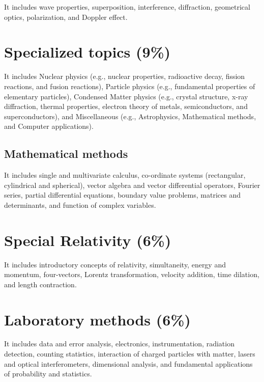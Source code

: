 \documentclass[12pt,a4paper]{article}
\begin{document}
\quad It includes wave properties, superposition, interference, diffraction, geometrical optics, polarization, and Doppler effect.


\section{Specialized topics (9\%)}

\quad It includes Nuclear physics (e.g., nuclear properties, radioactive decay, fission reactions, and fusion reactions), Particle physics (e.g., fundamental properties of elementary particles), Condensed Matter physics (e.g., crystal structure, x-ray diffraction, thermal properties, electron theory of metals, semiconductors, and superconductors), and Miscellaneous (e.g., Astrophysics, Mathematical methods, and Computer applications). 

\subsection{Mathematical methods}

It includes single and multivariate calculus, co-ordinate systems (rectangular, cylindrical and spherical), vector algebra and vector differential operators, Fourier series, partial differential equations, boundary value problems, matrices and determinants, and function of complex variables.


\section{Special Relativity (6\%)}

\quad It includes introductory concepts of relativity, simultaneity, energy and momentum, four-vectors, Lorentz transformation, velocity addition, time dilation, and length contraction.

\section{Laboratory methods (6\%)}

\quad It includes data and error analysis, electronics, instrumentation, radiation detection, counting statistics, interaction of charged particles with matter, lasers and optical interferometers, dimensional analysis, and fundamental applications of probability and statistics.
\end{document}
